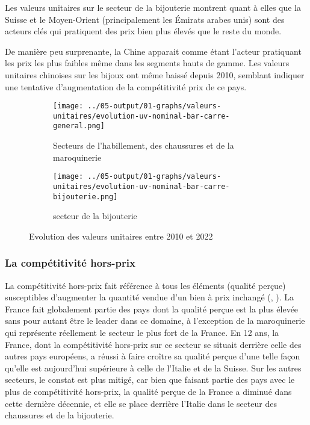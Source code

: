 \documentclass[french,10pt,a4paper]{article}
\begin{document}
Les valeurs unitaires sur le secteur de la bijouterie montrent quant à elles que la Suisse et le Moyen-Orient (principalement les Émirats arabes unis) sont des acteurs clés qui pratiquent des prix bien plus élevés que le reste du monde.

De manière peu surprenante, la Chine apparait comme étant l'acteur pratiquant les prix les plus faibles même dans les segments hauts de gamme. Les valeurs unitaires chinoises sur les bijoux ont même baissé depuis 2010, semblant indiquer une tentative d'augmentation de la compétitivité prix de ce pays. 



\begin{figure}[!h]
  \centering
  \begin{subfigure}{\textwidth}
    \centering    \texttt{[image: ../05-output/01-graphs/valeurs-unitaires/evolution-uv-nominal-bar-carre-general.png]}
    \caption{Secteurs de l'habillement, des chaussures et de la maroquinerie}
    \label{fig:evolution-uv-nominal-bar-carre-general}
  \end{subfigure}
  \vspace{0.5cm}
  \begin{subfigure}{\textwidth}
    \centering \texttt{[image: ../05-output/01-graphs/valeurs-unitaires/evolution-uv-nominal-bar-carre-bijouterie.png]}
 \caption{secteur de la bijouterie}
 \label{fig:evolution-uv-nominal-bar-carre-bijouterie.png}
  \end{subfigure}
  \caption{Evolution des valeurs unitaires entre 2010 et 2022}
  \label{fig:valeurs-unitaires}
\end{figure}


\subsubsection{La compétitivité hors-prix}
La compétitivité hors-prix fait référence à tous les éléments (qualité perçue) susceptibles d'augmenter la quantité vendue d'un bien à prix inchangé (\cite{Khandelwal2013}, \cite{Bas2015}). La France fait globalement partie des pays dont la qualité perçue est la plus élevée sans pour autant être le leader dans ce domaine, à l'exception de la maroquinerie qui représente réellement le secteur le plus fort de la France. En 12 ans, la France, dont la compétitivité hors-prix sur ce secteur se situait derrière celle des autres pays européens, a réussi à faire croître sa qualité perçue d'une telle façon qu'elle est aujourd'hui supérieure à celle de l'Italie et de la Suisse. Sur les autres secteurs, le constat est plus mitigé, car bien que faisant partie des pays avec le plus de compétitivité hors-prix, la qualité perçue de la France a diminué dans cette dernière décennie, et elle se place derrière l'Italie dans le secteur des chaussures et de la bijouterie.
\end{document}

